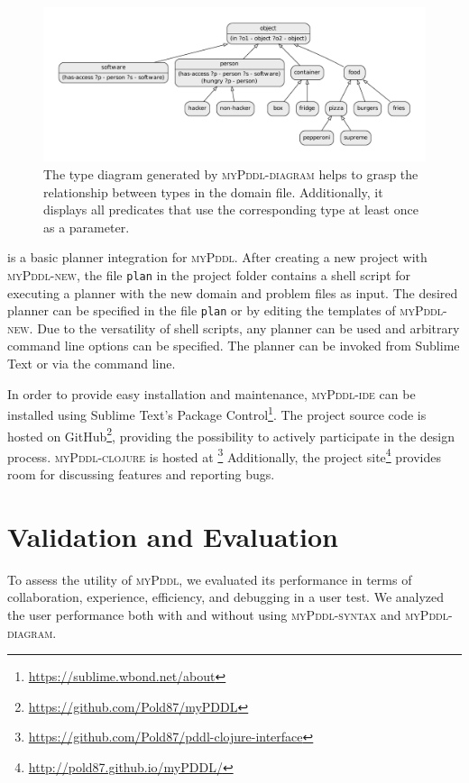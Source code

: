 \documentclass[runningheads]{llncs}
\newcommand{\mypddl}{\textsc{myPddl}\xspace}
\newcommand{\mypddlclojure}{\textsc{myPddl-clojure}\xspace}
\newcommand{\mypddlsyntax}{\textsc{myPddl-syntax}\xspace}
\newcommand{\mypddldiagram}{\textsc{myPddl-diagram}\xspace}
\newcommand{\mypddlnew}{\textsc{myPddl-new}\xspace}
\newcommand{\mypddlide}{\textsc{myPddl-ide}\xspace}
\newcommand{\sublimetext}{Sublime Text\xspace}
\begin{document}
\begin{description}
  \begin{figure}
    \centering
    \includegraphics[width=1\textwidth]{dot-diagram}
    \caption{The type diagram generated by \mypddldiagram helps to
      grasp the relationship between types in the domain
      file. Additionally, it displays all predicates that use the
      corresponding type at least once as a parameter.}
    \label{fig:diagram}
  \end{figure}

\item[myPDDL-plan] is a basic planner integration for \mypddl. After
  creating a new project with \mypddlnew, the file \texttt{plan} in
  the project folder contains a shell script for executing a planner
  with the new domain and problem files as input. The desired planner
  can be specified in the file \texttt{plan} or by editing the
  templates of \mypddlnew. Due to the versatility of shell scripts,
  any planner can be used and arbitrary command line options can be
  specified. The planner can be invoked from Sublime Text or via the
  command line.
\end{description}


In order to provide easy installation and maintenance, \mypddlide can
be installed using \sublimetext's Package
Control\footnote{\url{https://sublime.wbond.net/about}}.  The project
source code is hosted on
GitHub\footnote{\url{https://github.com/Pold87/myPDDL}}, providing the
possibility to actively participate in the design
process. \mypddlclojure is hosted at
\footnote{\url{https://github.com/Pold87/pddl-clojure-interface}}
Additionally, the project
site\footnote{\url{http://pold87.github.io/myPDDL/}} provides room for
discussing features and reporting bugs.

\section{Validation and Evaluation}
\label{sec:valid-eval}

To assess the utility of \mypddl, we evaluated its performance in
terms of collaboration, experience, efficiency, and debugging in a
user test. We analyzed the user performance both with and without
using \mypddlsyntax and \mypddldiagram.
\end{document}
